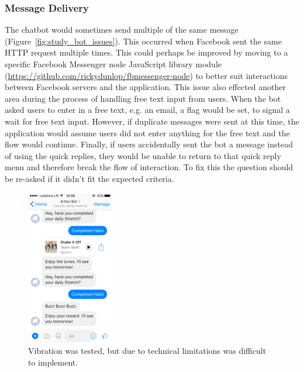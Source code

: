 \subsubsection*{Message Delivery}
The chatbot would sometimes send multiple of the same message (Figure~\ref{fig:study_bot_issues}). This occurred when Facebook sent the same HTTP request multiple times. This could perhaps be improved by moving to a specific Facebook Messenger node JavaScript library module (\url{https://github.com/rickydunlop/fbmessenger-node}) to better suit interactions between Facebook servers and the application. This issue also effected another area during the process of handling free text input from users. When the bot asked users to enter in a free text, e.g. an email, a flag would be set, to signal a wait for free text input. However, if duplicate messages were sent at this time, the application would assume users did not enter anything for the free text and the flow would continue. Finally, if users accidentally sent the bot a message instead of using the quick replies, they would be unable to return to that quick reply menu and therefore break the flow of interaction. To fix this the question should be re-asked if it didn't fit the expected criteria.

\begin{figure}[H]
    \centering
    \includegraphics[width=1.5in]{../resources/design/vibration-reward.png}
    \caption{Vibration was tested, but due to technical limitations was difficult to implement.}
    \label{fig:vibration_reward_issue}
\end{figure}


